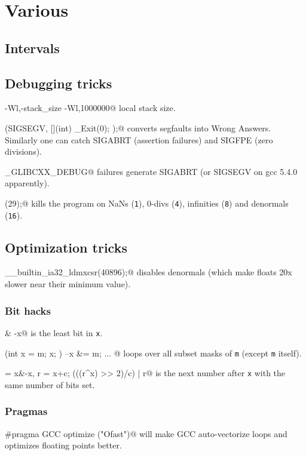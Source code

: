 \chapter{Various}

\section{Intervals}


\section{Debugging tricks}
\verb@-Wl,-stack_size -Wl,1000000@ local stack size.

\verb@signal(SIGSEGV, [](int) { _Exit(0); });@ converts segfaults into Wrong Answers.
			Similarly one can catch SIGABRT (assertion failures) and SIGFPE (zero divisions).

\verb@_GLIBCXX_DEBUG@ failures generate SIGABRT (or SIGSEGV on gcc 5.4.0 apparently).

\verb@feenableexcept(29);@ kills the program on NaNs (\texttt 1), 0-divs (\texttt 4), infinities (\texttt 8) and denormals (\texttt{16}).

\section{Optimization tricks}
	\verb@__builtin_ia32_ldmxcsr(40896);@ disables denormals (which make floats 20x slower near their minimum value).
	\subsection{Bit hacks}
		\verb@x & -x@ is the least bit in \texttt{x}.
		
		\verb@for (int x = m; x; ) { --x &= m; ... }@ loops over all subset masks of \texttt{m} (except \texttt{m} itself).
		
		\verb@c = x&-x, r = x+c; (((r^x) >> 2)/c) | r@ is the next number after \texttt{x} with the same number of bits set.
		
	\subsection{Pragmas}
		\verb@#pragma GCC optimize ("Ofast")@ will make GCC auto-vectorize loops and optimizes floating points better.
		
